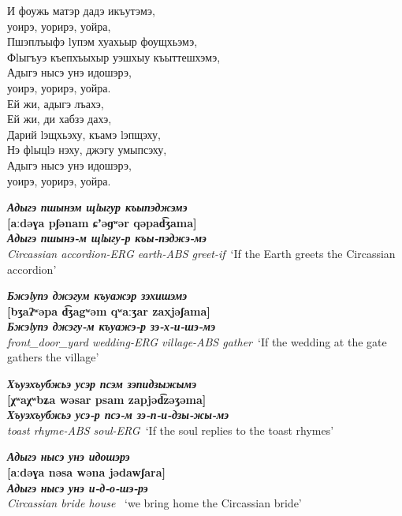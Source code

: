 \documentclass[a4paper,12pt]{book}
\newcommand{\1}[1]{\textbf{\emph{#1}}} %
\newcommand{\2}[1]{\textbf{[#1]}} %
\newcommand{\3}[1]{\fontsize{11pt}{0cm}\textbf{\emph{#1}}} %
\newcommand{\4}[1]{\fontsize{10pt}{0cm}\emph{#1}}	%
\newcommand{\5}[1]{\textbf{/#1/}} %
\newcommand{\6}[1]{\textbf{[#1]}} %
\newcommand{\7}[1]{\fontsize{12pt}{0cm}\emph{#1}} %
\newcommand{\8}[1]{\fontsize{12pt}{0cm}`#1'} %
\newcommand{\9}[1]{\fontsize{12pt}{0cm}(lit. `#1')} %
\begin{document}
И фоужь матэр дадэ икъутэмэ,\\
уоирэ, уорирэ, уойра,\\
Пшэплъыфэ lупэм хуахьыр фоущхьэмэ,\\
Фlыгъуэ къепхъыхыр уэшхыу къыттешхэмэ,\\
Адыгэ нысэ унэ идошэрэ,\\
уоирэ, уорирэ, уойра.\\

Ей жи, адыгэ лъахэ,\\
Ей жи, ди хабзэ дахэ,\\
Дарий lэщхьэху, къамэ lэпщэху,\\
Нэ фlыцlэ нэху, джэгу умыпсэху,\\
Адыгэ нысэ унэ идошэрэ,\\
уоирэ, уорирэ, уойра.\\



\begin{exe}
\ex
\1{Адыгэ пшынэм щlыгур къыпэджэмэ}\\
\2{aːdəɣa pʃənam ɕʼəɡʷər qəpad͡ʒama}\\
\3{Адыгэ пшынэ-м щlыгу-р къы-пэджэ-мэ}\\
\4{Circassian accordion-ERG earth-ABS greet-if}\
\trans \8{If the Earth greets the Circassian accordion}

\ex
\1{Бжэlупэ джэгум къуажэр зэхишэмэ}\\
\2{bʒaʔʷəpa d͡ʒagʷəm qʷaːʒar zaxjəʃama}\\
\3{Бжэlупэ джэгу-м къуажэ-р зэ-х-и-шэ-мэ}\\
\4{front\_door\_yard wedding-ERG village-ABS gather}\
\trans \8{If the wedding at the gate gathers the village}


\ex
\1{Хъуэхъубжьэ усэр псэм зэпидзыжымэ}\\
\2{χʷaχʷbʑa wəsar psam zapjəd͡zəʒəma}\\
\3{Хъуэхъубжьэ усэ-р псэ-м зэ-п-и-дзы-жы-мэ}\\
\4{toast rhyme-ABS soul-ERG}\
\trans \8{If the soul replies to the toast rhymes}


\ex
\1{Адыгэ нысэ унэ идошэрэ}\\
\2{aːdəɣa nəsa wəna jədawʃara}\\
\3{Адыгэ нысэ унэ и-д-о-шэ-рэ}\\
\4{Circassian bride house }\
\trans \8{we bring home the Circassian bride}

\end{exe}
\end{document}
